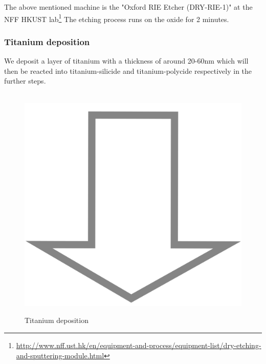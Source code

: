 The above mentioned machine is the "Oxford RIE Etcher (DRY-RIE-1)" at the NFF HKUST lab\footnote{\url{http://www.nff.ust.hk/en/equipment-and-process/equipment-list/dry-etching-and-sputtering-module.html}}
The etching process runs on the oxide for 2 minutes.

\newpage

\subsubsection{Titanium deposition}

We deposit a layer of titanium with a thickness of around 20-60nm which will then be reacted into titanium-silicide and titanium-polycide respectively in the further steps.

\begin{figure}[H]
	\centering
	\begin{tikzpicture}[node distance = 3cm, auto, thick,scale=\CrossSectionOnly, every node/.style={transform shape}]
		
	\end{tikzpicture}\\
	\includegraphics[scale=0.01]{down_arrow.png}\\
	\begin{tikzpicture}[node distance = 3cm, auto, thick,scale=\CrossSectionOnly, every node/.style={transform shape}]
		
	\end{tikzpicture}
	\caption{Titanium deposition}
\end{figure}


